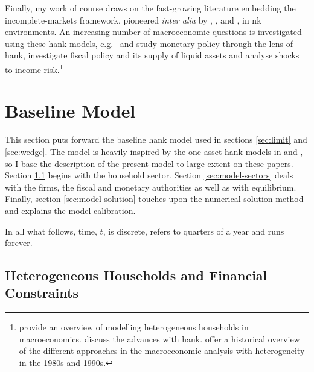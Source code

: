 \documentclass[a4paper,12pt]{article} %
\numberwithin{equation}{section} %
\numberwithin{figure}{section}
\numberwithin{table}{section}
\begin{document}
Finally, my work of course draws on the fast-growing literature embedding the incomplete-markets framework, pioneered \textit{inter alia} by \textcite{bewley1986}, \textcite{im1989}, \textcite{huggett1993} and \textcite{aiyagari1994}, in \Gls{nk} environments. An increasing number of macroeconomic questions is investigated using these \Gls{hank} models, e.g.~\textcite{mckay2016} and \textcite{kaplan2018} study monetary policy through the lens of \Gls{hank}, \textcite{bayer2023} investigate fiscal policy and its supply of liquid assets and \textcite{bayer2019} analyse shocks to income risk.\footnote{\textcite{heath2009} provide an overview of modelling heterogeneous households in macroeconomics. \textcite{kv2018} discuss the advances with \Gls{hank}. \textcite{cherrier2023} offer a historical overview of the different approaches in the macroeconomic analysis with heterogeneity in the 1980s and 1990s.}

\section{Baseline Model}
\label{sec:model}

This section puts forward the baseline \Gls{hank} model used in sections \ref{sec:limit} and \ref{sec:wedge}. The model is heavily inspired by the one-asset \Gls{hank} models in \textcite{auclert2021} and \textcite{boehl2023econpizza}, so I base the description of the present model to large extent on these papers. Section \ref{sec:model-hh} begins with the household sector. Section \ref{sec:model-sectors} deals with the firms, the fiscal and monetary authorities as well as with equilibrium. Finally, section \ref{sec:model-solution} touches upon the numerical solution method and explains the model calibration. 

In all what follows, time, $t$, is discrete, refers to quarters of a year and runs forever.

\subsection{Heterogeneous Households and Financial Constraints}
\label{sec:model-hh}
\end{document}

